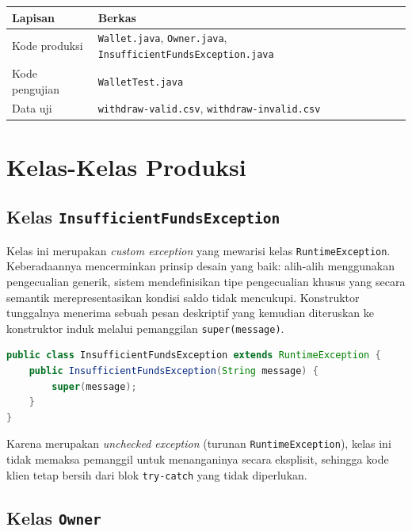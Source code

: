 \documentclass[12pt,a4paper]{article}
\begin{document}
\begin{center}
\begin{tabular}{ll}
\toprule
\textbf{Lapisan} & \textbf{Berkas} \\
\midrule
Kode produksi & \texttt{Wallet.java}, \texttt{Owner.java}, \texttt{InsufficientFundsException.java} \\
Kode pengujian & \texttt{WalletTest.java} \\
Data uji & \texttt{withdraw-valid.csv}, \texttt{withdraw-invalid.csv} \\
\bottomrule
\end{tabular}
\end{center}

\section{Kelas-Kelas Produksi}

\subsection{Kelas \texttt{InsufficientFundsException}}

Kelas ini merupakan \textit{custom exception} yang mewarisi kelas
\texttt{RuntimeException}.  Keberadaannya mencerminkan prinsip desain yang baik: alih-alih
menggunakan pengecualian generik, sistem mendefinisikan tipe pengecualian khusus yang
secara semantik merepresentasikan kondisi saldo tidak mencukupi.  Konstruktor tunggalnya
menerima sebuah pesan deskriptif yang kemudian diteruskan ke konstruktor induk melalui
pemanggilan \texttt{super(message)}.

\begin{lstlisting}[language=Java, caption={Definisi \texttt{InsufficientFundsException}}]
public class InsufficientFundsException extends RuntimeException {
    public InsufficientFundsException(String message) {
        super(message);
    }
}
\end{lstlisting}

Karena merupakan \textit{unchecked exception} (turunan \texttt{RuntimeException}), kelas
ini tidak memaksa pemanggil untuk menanganinya secara eksplisit, sehingga kode klien
tetap bersih dari blok \texttt{try-catch} yang tidak diperlukan.

\subsection{Kelas \texttt{Owner}}
\end{document}
